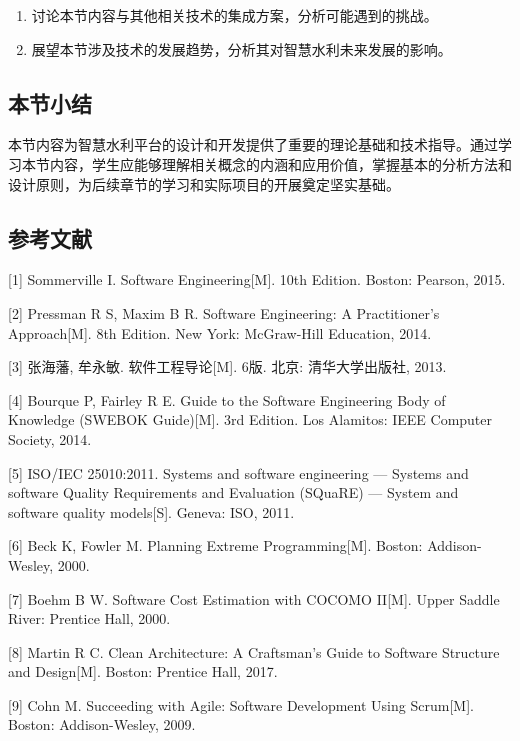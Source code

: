 \begin{enumerate}
\def\labelenumi{\arabic{enumi}.}
\tightlist
\item
  讨论本节内容与其他相关技术的集成方案，分析可能遇到的挑战。
\item
  展望本节涉及技术的发展趋势，分析其对智慧水利未来发展的影响。
\end{enumerate}

\hypertarget{ux672cux8282ux5c0fux7ed3-1}{%
\subsection{本节小结}\label{ux672cux8282ux5c0fux7ed3-1}}

本节内容为智慧水利平台的设计和开发提供了重要的理论基础和技术指导。通过学习本节内容，学生应能够理解相关概念的内涵和应用价值，掌握基本的分析方法和设计原则，为后续章节的学习和实际项目的开展奠定坚实基础。

\hypertarget{ux53c2ux8003ux6587ux732e-1}{%
\subsection{参考文献}\label{ux53c2ux8003ux6587ux732e-1}}

{[}1{]} Sommerville I. Software Engineering{[}M{]}. 10th Edition. Boston: Pearson, 2015.

{[}2{]} Pressman R S, Maxim B R. Software Engineering: A Practitioner's Approach{[}M{]}. 8th Edition. New York: McGraw-Hill Education, 2014.

{[}3{]} 张海藩, 牟永敏. 软件工程导论{[}M{]}. 6版. 北京: 清华大学出版社, 2013.

{[}4{]} Bourque P, Fairley R E. Guide to the Software Engineering Body of Knowledge (SWEBOK Guide){[}M{]}. 3rd Edition. Los Alamitos: IEEE Computer Society, 2014.

{[}5{]} ISO/IEC 25010:2011. Systems and software engineering --- Systems and software Quality Requirements and Evaluation (SQuaRE) --- System and software quality models{[}S{]}. Geneva: ISO, 2011.

{[}6{]} Beck K, Fowler M. Planning Extreme Programming{[}M{]}. Boston: Addison-Wesley, 2000.

{[}7{]} Boehm B W. Software Cost Estimation with COCOMO II{[}M{]}. Upper Saddle River: Prentice Hall, 2000.

{[}8{]} Martin R C. Clean Architecture: A Craftsman's Guide to Software Structure and Design{[}M{]}. Boston: Prentice Hall, 2017.

{[}9{]} Cohn M. Succeeding with Agile: Software Development Using Scrum{[}M{]}. Boston: Addison-Wesley, 2009.

